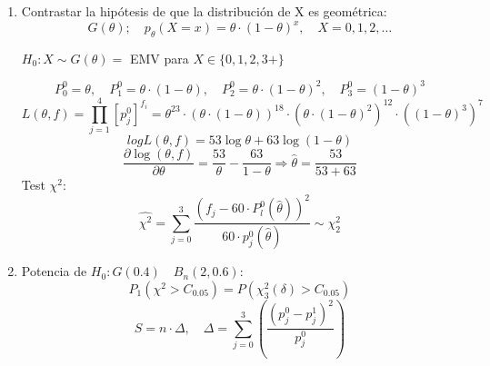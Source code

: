 \begin{enumerate}[label=\alph*)]
    \item Contrastar la hipótesis de que la distribución de X es geométrica:
    \[
        G(\theta);\quad p_\theta(X=x)=\theta \cdot (1- \theta)^x, \quad X=0,1,2,\dots
    \]

    $H_0: X \sim G(\theta)=$ EMV para $X \in \{0,1,2,3+\}$

    \[
        P_0^0=\theta, \quad P_1^0=\theta \cdot (1-\theta), \quad P_2^0=\theta \cdot (1-\theta)^2, \quad P_3^0=(1-\theta)^3
    \]
    \[
        L(\theta,f)=\prod_{j=1}^{4}[p_j^0]^{f_i}= \theta^{23}\cdot(\theta \cdot (1-\theta))^{18} \cdot (\theta \cdot (1-\theta)^2)^{12} \cdot ((1-\theta)^3)^7
    \]
    \[
        log L(\theta,f)=53 \log \theta+63 \log (1-\theta)
    \]
    \[
        \frac{\partial \log(\theta,f)}{\partial \theta}=\frac{53}{\theta}-\frac{63}{1-\theta} \Longrightarrow \widehat{\theta}=\frac{53}{53+63}
    \]
    Test $\chi^2$:
    \[
        \widehat{\chi^2}=\sum_{j=0}^{3} \frac{(f_j-60\cdot P_l^0(\widehat{\theta}))^2}{60 \cdot p_j^0(\widehat{\theta})} \sim \chi^2_2
    \]

    \item Potencia de $H_0:G(0.4) \quad B_n(2,0.6)$:
    \[
        P_1(\chi^2> C_{0.05})=P(\chi_3^2(\delta)>C_{0.05})
    \]
    \[
        S=n \cdot \Delta, \quad \Delta=\sum_{j=0}^{3} \left(\frac{(p_j^0-p_j^1)^2}{p_j^0}\right)
    \]
\end{enumerate}
